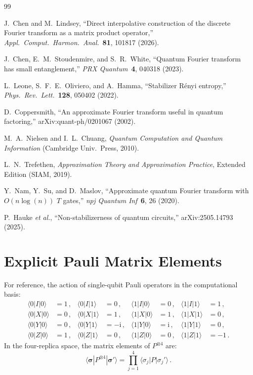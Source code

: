 \documentclass[11pt,a4paper]{article}
\theoremstyle{definition}
\theoremstyle{remark}
\newcommand{\ii}{\mathrm{i}}
\begin{document}
\begin{thebibliography}{99}

J.~Chen and M.~Lindsey,
``Direct interpolative construction of the discrete Fourier transform as a matrix product operator,''
\textit{Appl.\ Comput.\ Harmon.\ Anal.}\ \textbf{81}, 101817 (2026).

J.~Chen, E.~M.~Stoudenmire, and S.~R.~White,
``Quantum Fourier transform has small entanglement,''
\textit{PRX Quantum}\ \textbf{4}, 040318 (2023).

L.~Leone, S.~F.~E.~Oliviero, and A.~Hamma,
``Stabilizer R\'enyi entropy,''
\textit{Phys.\ Rev.\ Lett.}\ \textbf{128}, 050402 (2022).

D.~Coppersmith,
``An approximate Fourier transform useful in quantum factoring,''
arXiv:quant-ph/0201067 (2002).

M.~A.~Nielsen and I.~L.~Chuang,
\textit{Quantum Computation and Quantum Information}
(Cambridge Univ.\ Press, 2010).

L.~N.~Trefethen,
\textit{Approximation Theory and Approximation Practice}, Extended Edition
(SIAM, 2019).

Y.~Nam, Y.~Su, and D.~Maslov,
``Approximate quantum Fourier transform with $O(n\log(n))$ $T$ gates,''
\textit{npj Quantum Inf}\ \textbf{6}, 26 (2020).

P.~Hauke \textit{et al.},
``Non-stabilizerness of quantum circuits,''
arXiv:2505.14793 (2025).

\end{thebibliography}

\appendix

\section{Explicit Pauli Matrix Elements}
\label{app:pauli}

For reference, the action of single-qubit Pauli operators in the computational basis:
\begin{align}
  \langle 0|I|0\rangle &= 1\,, & \langle 0|I|1\rangle &= 0\,, &
  \langle 1|I|0\rangle &= 0\,, & \langle 1|I|1\rangle &= 1\,,\\
  \langle 0|X|0\rangle &= 0\,, & \langle 0|X|1\rangle &= 1\,, &
  \langle 1|X|0\rangle &= 1\,, & \langle 1|X|1\rangle &= 0\,,\\
  \langle 0|Y|0\rangle &= 0\,, & \langle 0|Y|1\rangle &= -\ii\,, &
  \langle 1|Y|0\rangle &= \ii\,, & \langle 1|Y|1\rangle &= 0\,,\\
  \langle 0|Z|0\rangle &= 1\,, & \langle 0|Z|1\rangle &= 0\,, &
  \langle 1|Z|0\rangle &= 0\,, & \langle 1|Z|1\rangle &= -1\,.
\end{align}
In the four-replica space, the matrix elements of $P^{\otimes 4}$ are:
\begin{equation}
  \langle\boldsymbol{\sigma}|P^{\otimes 4}|\boldsymbol{\sigma}'\rangle
  = \prod_{j=1}^4 \langle\sigma_j|P|\sigma_j'\rangle\,.
\end{equation}
\end{document}
